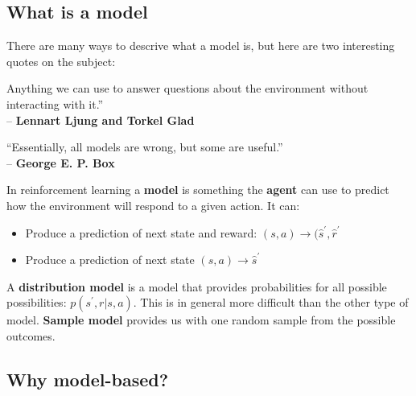 \subsection*{What is a model}
There are many ways to descrive what a model is, but here are two interesting quotes on the subject:


\begin{wbox}{}
\begin{center}
Anything we can use to answer questions about the environment without interacting
with it.” \\– \textbf{Lennart Ljung and Torkel Glad}

\vspace{0.5 cm}

“Essentially, all models are wrong, but some are useful.” \\– \textbf{George E. P. Box}
\end{center}
\end{wbox}

In reinforcement learning a \textbf{model} is something the \textbf{agent} can use to predict how the environment will respond to a given action. It can:
	
\begin{itemize}
	\item Produce a prediction of next state and reward: $(s,a) \rightarrow (\hat{s}^{\prime}, \hat{r}^{\prime}$
	\item Produce a prediction of next state $(s,a) \rightarrow \hat{s}^{\prime}$
\end{itemize}

A \textbf{distribution model} is a model that provides probabilities for all possible possibilities: $p(s^{\prime}, r|s,a)$. This is in general more difficult than the other type of model. \textbf{Sample model} provides us with one random sample from the possible outcomes. 

\subsection*{Why model-based?}




















